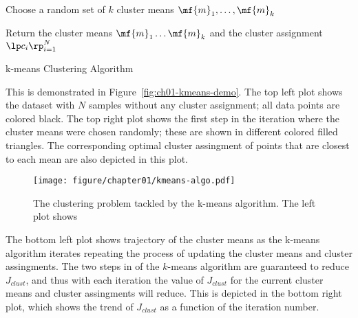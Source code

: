 \begin{boxedstuff}
    \begin{algorithm}[H]
    \SetAlgoLined
    \BlankLine
    Choose a random set of $k$ cluster means $\mf{m}_1,\ldots,\mf{m}_k$\;

    Return the cluster means $\mf{m}_1 \ldots \mf{m}_k$ and the cluster assignment $\lp c_i \rp_{i=1}^N$\;
    \caption{k-means Clustering Algorithm}
    \label{alg:ch01-kmeans}
    \end{algorithm}
\end{boxedstuff}

This is demonstrated in Figure~\ref{fig:ch01-kmeans-demo}. The top left plot shows the dataset with $N$ samples without any cluster assignment; all data points are colored black. The top right plot shows the first step in the iteration where the cluster means were chosen randomly; these are shown in different colored filled triangles. The corresponding optimal cluster assingment of points that are closest to each mean are also depicted in this plot.

\begin{figure}[h]
    \centering
    \texttt{[image: figure/chapter01/kmeans-algo.pdf]}
    \caption{The clustering problem tackled by the k-means algorithm. The left plot shows  }
    \label{fig:ch01-kmeans-algo}
\end{figure}

The bottom left plot shows trajectory of the cluster means as the k-means algorithm iterates repeating the process of updating the cluster means and cluster assingments. The two steps in of the $k$-means algorithm are guaranteed to reduce $J_{clust}$, and thus with each iteration the value of $J_{clust}$ for the current cluster means and cluster assingments will reduce. This is depicted in the bottom right plot, which shows the trend of $J_{clust}$ as a function of the iteration number.
\newpage

